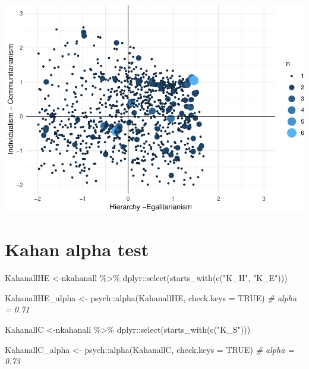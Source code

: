 \documentclass[
]{article}
\newenvironment{Shaded}{\begin{snugshade}}{\end{snugshade}}
\newcommand{\AttributeTok}[1]{\textcolor[rgb]{0.77,0.63,0.00}{#1}}
\newcommand{\CommentTok}[1]{\textcolor[rgb]{0.56,0.35,0.01}{\textit{#1}}}
\newcommand{\ConstantTok}[1]{\textcolor[rgb]{0.00,0.00,0.00}{#1}}
\newcommand{\FunctionTok}[1]{\textcolor[rgb]{0.00,0.00,0.00}{#1}}
\newcommand{\NormalTok}[1]{#1}
\newcommand{\OtherTok}[1]{\textcolor[rgb]{0.56,0.35,0.01}{#1}}
\newcommand{\SpecialCharTok}[1]{\textcolor[rgb]{0.00,0.00,0.00}{#1}}
\newcommand{\StringTok}[1]{\textcolor[rgb]{0.31,0.60,0.02}{#1}}
\begin{document}
\includegraphics{withmice_files/figure-latex/unnamed-chunk-13-1.pdf}

\hypertarget{kahan-alpha-test}{%
\section{Kahan alpha test}\label{kahan-alpha-test}}

\begin{Shaded}
\begin{Highlighting}[]
\NormalTok{KahanallHE }\OtherTok{\textless{}{-}}\NormalTok{nkahanall }\SpecialCharTok{\%\textgreater{}\%}
\NormalTok{  dplyr}\SpecialCharTok{::}\FunctionTok{select}\NormalTok{(}\FunctionTok{starts\_with}\NormalTok{(}\FunctionTok{c}\NormalTok{(}\StringTok{"K\_H"}\NormalTok{, }\StringTok{"K\_E"}\NormalTok{)))}

\NormalTok{KahanallHE\_alpha }\OtherTok{\textless{}{-}}\NormalTok{ psych}\SpecialCharTok{::}\FunctionTok{alpha}\NormalTok{(KahanallHE, }\AttributeTok{check.keys =} \ConstantTok{TRUE}\NormalTok{) }\CommentTok{\# alpha = 0.71  }

\NormalTok{KahanallC }\OtherTok{\textless{}{-}}\NormalTok{nkahanall }\SpecialCharTok{\%\textgreater{}\%}
\NormalTok{  dplyr}\SpecialCharTok{::}\FunctionTok{select}\NormalTok{(}\FunctionTok{starts\_with}\NormalTok{(}\FunctionTok{c}\NormalTok{(}\StringTok{"K\_S"}\NormalTok{)))}

\NormalTok{KahanallC\_alpha }\OtherTok{\textless{}{-}}\NormalTok{ psych}\SpecialCharTok{::}\FunctionTok{alpha}\NormalTok{(KahanallC, }\AttributeTok{check.keys =} \ConstantTok{TRUE}\NormalTok{) }\CommentTok{\# alpha = 0.73}
\end{Highlighting}
\end{Shaded}
\end{document}
